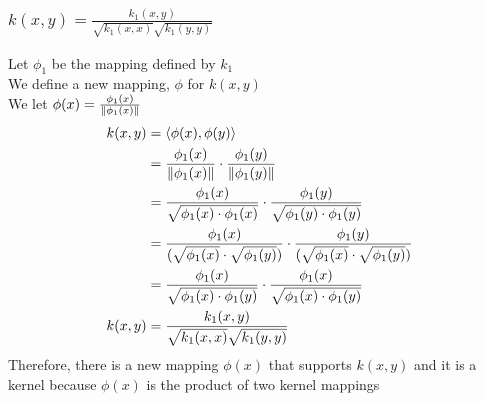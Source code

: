 \documentclass[letterpaper, 12pt]{article}
\begin{document}
\subsubsection{$k(x, y) = \frac{k_{1}(x ,y) }{\sqrt{k_{1}(x, x)} \sqrt{k_{1}(y, y)} }$}
Let $\phi_{1}$ be the mapping defined by $k_{1}$\\
We define a new mapping, $\phi$ for $k(x ,y)$\\
We let $\phi(x) = \frac{\phi_{1} (x)}{\norm{\phi_{1}(x)}}$\\
\begin{equation*}
\begin{split}
k(x, y) &= \langle \phi (x), \phi (y) \rangle \\
&= \frac{\phi_{1}(x)}{\norm{\phi_{1}(x)}} \cdot  \frac{\phi_{1}(y)}{\norm{\phi_{1}(y)}}\\
&= \frac{\phi_{1}(x)}{\sqrt{\phi_{1}(x) \cdot \phi_{1}(x)}} \cdot \frac{\phi_{1}(y)}{\sqrt{\phi_{1}(y) \cdot \phi_{1}(y)}}\\
&= \frac{\phi_{1}(x)}{( \sqrt{\phi_{1}(x)} \cdot \sqrt{ \phi_{1}(y)}  )}  \cdot \frac{\phi_{1}(y)}{( \sqrt{\phi_{1}(x)} \cdot \sqrt{ \phi_{1}(y)}  )} \\
&= \frac{\phi_{1}(x)}{ \sqrt{\phi_{1}(x) \cdot  \phi_{1}(y) }}  \cdot  \frac{\phi_{1}(x)}{ \sqrt{\phi_{1}(x) \cdot  \phi_{1}(y) }}\\
 k(x, y) &= \frac{k_{1}(x ,y) }{\sqrt{k_{1}(x, x)} \sqrt{k_{1}(y, y)} }
\end{split}
\end{equation*}
Therefore, there is a new mapping $\phi(x)$ that supports $k(x, y)$ and it is a kernel because $\phi(x)$
is the product of two kernel mappings
\end{document}
